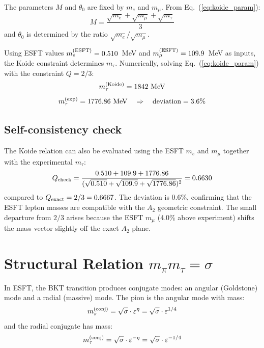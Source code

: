 ﻿\documentclass[twocolumn,preprintnumbers,amsmath,amssymb]{revtex4-2}
\begin{document}
The parameters $M$ and $\theta_0$ are fixed by $m_e$ and $m_\mu$. From Eq.~(\ref{eq:koide_param}):
\begin{equation}
M = \frac{\sqrt{m_e} + \sqrt{m_\mu} + \sqrt{m_\tau}}{3}
\end{equation}
and $\theta_0$ is determined by the ratio $\sqrt{m_e}/\sqrt{m_\mu}$.

Using ESFT values $m_e^{(\rm ESFT)} = 0.510$~MeV and $m_\mu^{(\rm ESFT)} = 109.9$~MeV as inputs, the Koide constraint determines $m_\tau$. Numerically, solving Eq.~(\ref{eq:koide_param}) with the constraint $Q = 2/3$:
\begin{equation}
m_\tau^{(\rm Koide)} = 1842~\text{MeV}
\end{equation}
\begin{equation}
m_\tau^{(\rm exp)} = 1776.86~\text{MeV} \quad \Rightarrow \quad \text{deviation} = 3.6\%
\end{equation}

\subsection{Self-consistency check}

The Koide relation can also be evaluated using the ESFT $m_e$ and $m_\mu$ together with the experimental $m_\tau$:
\begin{equation}
Q_{\rm check} = \frac{0.510 + 109.9 + 1776.86}{(\sqrt{0.510} + \sqrt{109.9} + \sqrt{1776.86})^2} = 0.6630
\end{equation}
compared to $Q_{\rm exact} = 2/3 = 0.6667$. The deviation is 0.6\%, confirming that the ESFT lepton masses are compatible with the $A_2$ geometric constraint. The small departure from $2/3$ arises because the ESFT $m_\mu$ (4.0\% above experiment) shifts the mass vector slightly off the exact $A_2$ plane.

\section{Structural Relation $m_\pi m_\tau = \sigma$}
\label{sec:pitau}

In ESFT, the BKT transition produces conjugate modes: an angular (Goldstone) mode and a radial (massive) mode. The pion is the angular mode with mass:
\begin{equation}
m_\pi^{(\rm conj)} = \sqrt{\sigma} \cdot \varepsilon^{\eta} = \sqrt{\sigma} \cdot \varepsilon^{1/4}
\end{equation}
and the radial conjugate has mass:
\begin{equation}
m_\tau^{(\rm conj)} = \sqrt{\sigma} \cdot \varepsilon^{-\eta} = \sqrt{\sigma} \cdot \varepsilon^{-1/4}
\end{equation}
\end{document}
